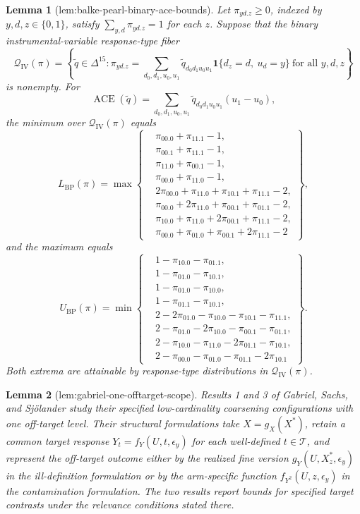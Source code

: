 \documentclass{article}
\newtheorem{lemma}{Lemma}
\begin{document}
\begin{lemma}[lem:balke-pearl-binary-ace-bounds]\label{lem:balke-pearl-binary-ace-bounds}
Let \(\pi_{yd.z}\ge 0\), indexed by \(y,d,z\in\{0,1\}\), satisfy \(\sum_{y,d}\pi_{yd.z}=1\) for each \(z\). Suppose that the binary instrumental-variable response-type fiber
\[
 \mathcal Q_{\mathrm{IV}}(\pi)
 =\left\{\widetilde q\in\Delta^{15}:
 \pi_{yd.z}=\sum_{d_0,d_1,u_0,u_1}\widetilde q_{d_0d_1u_0u_1}
 \mathbf 1\{d_z=d,\ u_d=y\}\ \text{for all }y,d,z\right\}
\]
is nonempty. For
\[
 \operatorname{ACE}(\widetilde q)
 =\sum_{d_0,d_1,u_0,u_1}\widetilde q_{d_0d_1u_0u_1}(u_1-u_0),
\]
the minimum over \(\mathcal Q_{\mathrm{IV}}(\pi)\) equals
\[
L_{\mathrm{BP}}(\pi)=\max\left\{
\begin{aligned}
&\pi_{00.0}+\pi_{11.1}-1,\\
&\pi_{00.1}+\pi_{11.1}-1,\\
&\pi_{11.0}+\pi_{00.1}-1,\\
&\pi_{00.0}+\pi_{11.0}-1,\\
&2\pi_{00.0}+\pi_{11.0}+\pi_{10.1}+\pi_{11.1}-2,\\
&\pi_{00.0}+2\pi_{11.0}+\pi_{00.1}+\pi_{01.1}-2,\\
&\pi_{10.0}+\pi_{11.0}+2\pi_{00.1}+\pi_{11.1}-2,\\
&\pi_{00.0}+\pi_{01.0}+\pi_{00.1}+2\pi_{11.1}-2
\end{aligned}\right\},
\]
and the maximum equals
\[
U_{\mathrm{BP}}(\pi)=\min\left\{
\begin{aligned}
&1-\pi_{10.0}-\pi_{01.1},\\
&1-\pi_{01.0}-\pi_{10.1},\\
&1-\pi_{01.0}-\pi_{10.0},\\
&1-\pi_{01.1}-\pi_{10.1},\\
&2-2\pi_{01.0}-\pi_{10.0}-\pi_{10.1}-\pi_{11.1},\\
&2-\pi_{01.0}-2\pi_{10.0}-\pi_{00.1}-\pi_{01.1},\\
&2-\pi_{10.0}-\pi_{11.0}-2\pi_{01.1}-\pi_{10.1},\\
&2-\pi_{00.0}-\pi_{01.0}-\pi_{01.1}-2\pi_{10.1}
\end{aligned}\right\}.
\]
Both extrema are attainable by response-type distributions in \(\mathcal Q_{\mathrm{IV}}(\pi)\).
\end{lemma}

\begin{lemma}[lem:gabriel-one-offtarget-scope]\label{lem:gabriel-one-offtarget-scope}
Results 1 and 3 of Gabriel, Sachs, and Sj\"olander study their specified low-cardinality coarsening configurations with one off-target level.  Their structural formulations take \(X=g_X(X^*)\), retain a common target response \(Y_t=f_Y(U,t,\epsilon_y)\) for each well-defined \(t\in\mathcal T\), and represent the off-target outcome either by the realized fine version \(g_Y(U,X_z^*,\epsilon_y)\) in the ill-definition formulation or by the arm-specific function \(f_{Y^2}(U,z,\epsilon_y)\) in the contamination formulation.  The two results report bounds for specified target contrasts under the relevance conditions stated there.
\end{lemma}
\end{document}
